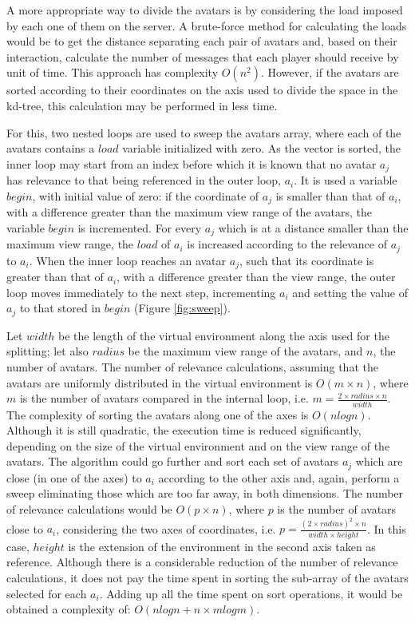\documentclass[acmjacm]{acmtrans2m}
\begin{document}
A more appropriate way to divide the avatars is by considering the load imposed by each one of them on the server. A brute-force method for calculating the loads would be to get the distance separating each pair of avatars and, based on their interaction, calculate the number of messages that each player should receive by unit of time. This approach has complexity $O(n^2)$. However, if the avatars are sorted according to their coordinates on the axis used to divide the space in the kd-tree, this calculation may be performed in less time.

For this, two nested loops are used to sweep the avatars array, where each of the avatars contains a $load$ variable initialized with zero. As the vector is sorted, the inner loop may start from an index before which it is known that no avatar $a_j$ has relevance to that being referenced in the outer loop, $a_i$. It is used a variable $begin$, with initial value of zero: if the coordinate of $a_j$ is smaller than that of $a_i$, with a difference greater than the maximum view range of the avatars, the variable $begin$ is incremented. For every $a_j$ which is at a distance smaller than the maximum view range, the $load$ of $a_i$ is increased according to the relevance of $a_j$ to $a_i$. When the inner loop reaches an avatar $a_j$, such that its coordinate is greater than that of $a_i$, with a difference greater than the view range, the outer loop moves immediately to the next step, incrementing $a_i$ and setting the value of $a_j$ to that stored in $begin$ (Figure \ref{fig:sweep}).

Let $width$ be the length of the virtual environment along the axis used for the splitting; let also $radius$ be the maximum view range of the avatars, and $n$, the number of avatars. The number of relevance calculations, assuming that the avatars are uniformly distributed in the virtual environment is \mbox{$O(m \times n)$}, where $m$ is the number of avatars compared in the internal loop, i.e. \mbox{$m = \frac{2 \times radius \times n}{width}$}. The complexity of sorting the avatars along one of the axes is $O(nlogn)$. Although it is still quadratic, the execution time is reduced significantly, depending on the size of the virtual environment and on the view range of the avatars. The algorithm could go further and sort each set of avatars $a_j$ which are close (in one of the axes) to $a_i$ according to the other axis and, again, perform a sweep eliminating those which are too far away, in both dimensions. The number of relevance calculations would be \mbox{$O(p \times n)$}, where $p$ is the number of avatars close to $a_i$, considering the two axes of coordinates, i.e. \mbox{$p = \frac{(2 \times radius)^2 \times n}{width \times height}$}. In this case, $height$ is the extension of the environment in the second axis taken as reference. Although there is a considerable reduction of the number of relevance calculations, it does not pay the time spent in sorting the sub-array of the avatars selected for each $a_i$. Adding up all the time spent on sort operations, it would be obtained a complexity of: \mbox{$O(nlogn + n \times mlogm)$}.
\end{document}
